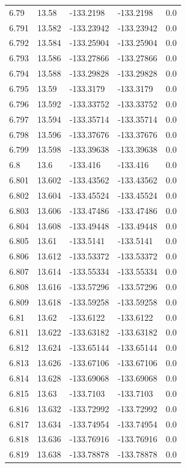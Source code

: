 \begin{tabular}{lllll}
6.79 & 13.58 & -133.2198 & -133.2198 & 0.0 \\
6.791 & 13.582 & -133.23942 & -133.23942 & 0.0 \\
6.792 & 13.584 & -133.25904 & -133.25904 & 0.0 \\
6.793 & 13.586 & -133.27866 & -133.27866 & 0.0 \\
6.794 & 13.588 & -133.29828 & -133.29828 & 0.0 \\
6.795 & 13.59 & -133.3179 & -133.3179 & 0.0 \\
6.796 & 13.592 & -133.33752 & -133.33752 & 0.0 \\
6.797 & 13.594 & -133.35714 & -133.35714 & 0.0 \\
6.798 & 13.596 & -133.37676 & -133.37676 & 0.0 \\
6.799 & 13.598 & -133.39638 & -133.39638 & 0.0 \\
6.8 & 13.6 & -133.416 & -133.416 & 0.0 \\
6.801 & 13.602 & -133.43562 & -133.43562 & 0.0 \\
6.802 & 13.604 & -133.45524 & -133.45524 & 0.0 \\
6.803 & 13.606 & -133.47486 & -133.47486 & 0.0 \\
6.804 & 13.608 & -133.49448 & -133.49448 & 0.0 \\
6.805 & 13.61 & -133.5141 & -133.5141 & 0.0 \\
6.806 & 13.612 & -133.53372 & -133.53372 & 0.0 \\
6.807 & 13.614 & -133.55334 & -133.55334 & 0.0 \\
6.808 & 13.616 & -133.57296 & -133.57296 & 0.0 \\
6.809 & 13.618 & -133.59258 & -133.59258 & 0.0 \\
6.81 & 13.62 & -133.6122 & -133.6122 & 0.0 \\
6.811 & 13.622 & -133.63182 & -133.63182 & 0.0 \\
6.812 & 13.624 & -133.65144 & -133.65144 & 0.0 \\
6.813 & 13.626 & -133.67106 & -133.67106 & 0.0 \\
6.814 & 13.628 & -133.69068 & -133.69068 & 0.0 \\
6.815 & 13.63 & -133.7103 & -133.7103 & 0.0 \\
6.816 & 13.632 & -133.72992 & -133.72992 & 0.0 \\
6.817 & 13.634 & -133.74954 & -133.74954 & 0.0 \\
6.818 & 13.636 & -133.76916 & -133.76916 & 0.0 \\
6.819 & 13.638 & -133.78878 & -133.78878 & 0.0 \\

\end{tabular}
